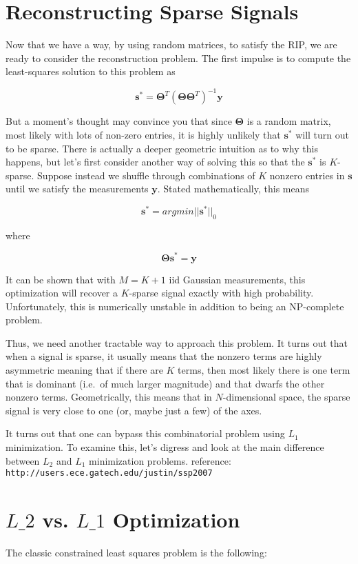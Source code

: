 \documentclass[letterpaper,10pt,english]{/usr/lib/python2.7/site-packages/sphinx/texinputs/sphinxhowto}
\begin{document}
\section{Reconstructing Sparse Signals
}Now that we have a way, by using random matrices, to satisfy the RIP, we
are ready to consider the reconstruction problem. The first impulse is
to compute the least-squares solution to this problem as

\[ \mathbf{s}^* = \mathbf{\Theta}^T (\mathbf{\Theta}\mathbf{\Theta}^T)^{-1}\mathbf{y} \]

But a moment's thought may convince you that since $\mathbf{\Theta}$ is
a random matrix, most likely with lots of non-zero entries, it is highly
unlikely that $\mathbf{s}^*$ will turn out to be sparse. There is
actually a deeper geometric intuition as to why this happens, but let's
first consider another way of solving this so that the $\mathbf{s}^*$ is
$K$-sparse. Suppose instead we shuffle through combinations of $K$
nonzero entries in $\mathbf{s}$ until we satisfy the measurements
$\mathbf{y}$. Stated mathematically, this means

\[ \mathbf{s}^* = argmin || \mathbf{s}^* ||_0  \]

where

\[ \mathbf{\Theta} \mathbf{s}^* = \mathbf{y} \]

It can be shown that with $M=K+1$ iid Gaussian measurements, this
optimization will recover a $K$-sparse signal exactly with high
probability. Unfortunately, this is numerically unstable in addition to
being an NP-complete problem.

Thus, we need another tractable way to approach this problem. It turns
out that when a signal is sparse, it usually means that the nonzero
terms are highly asymmetric meaning that if there are $K$ terms, then
most likely there is one term that is dominant (i.e.~of much larger
magnitude) and that dwarfs the other nonzero terms. Geometrically, this
means that in $N$-dimensional space, the sparse signal is very close to
one (or, maybe just a few) of the axes.

It turns out that one can bypass this combinatorial problem using $L_1$
minimization. To examine this, let's digress and look at the main
difference between $L_2$ and $L_1$ minimization problems.
reference: \texttt{http://users.ece.gatech.edu/justin/ssp2007}
\section{$L\_2$ vs. $L\_1$ Optimization
}The classic constrained least squares problem is the following:
\end{document}

